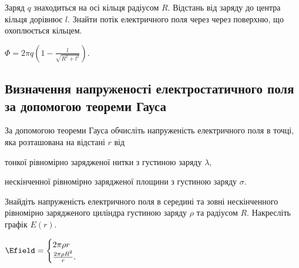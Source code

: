 
\begin{problem}
Заряд $q$ знаходиться на осі кільця радіусом $R$. Відстань від заряду до центра кільця дорівнює $l$. Знайти потік електричного поля через через поверхню, що охоплюється кільцем.
\begin{solution}
	$\Phi = 2\pi q\left( 1 - \frac{l}{\sqrt{R^2 + l^2}}\right) $.
\end{solution}
\end{problem}

\subsection*{Визначення напруженості електростатичного поля за допомогою теореми Гауса}

\begin{problem}
	За допомогою теореми Гауса обчисліть напруженість електричного поля в точці, яка розташована на відстані $r$ від
\begin{enumerate*}[label=\alph*)]
\item тонкої рівномірно зарядженої нитки з густиною заряду $\lambda$,
\item нескінченної рівномірно зарядженої площини з густиною заряду $\sigma$.
\end{enumerate*}
\end{problem}

\begin{problem}
    Знайдіть напруженість електричного поля в середині та зовні нескінченного рівномірно зарядженого циліндра густиною заряду $\rho$ та радіусом $R$. Накресліть графік $E(r)$.
\begin{solution}
	$\Efield =
		\begin{cases}
			2\pi\rho r\\
			\frac{2\pi\rho R^2}{r}.
		\end{cases}
	$
\end{solution}
\end{problem}

